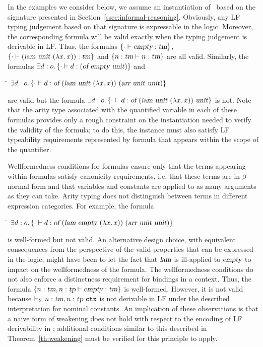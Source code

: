 In the examples we consider below, we assume an instantiation of
\logic\ 
based on the signature presented in
Section~\ref{ssec:informal-reasoning}.
%
Obviously, any LF typing judgement based on that signature is expressable
in the logic.
%
Moreover, the corresponding formula will be valid exactly when the
typing judgement is derivable in LF.
%
Thus, the formulas
$\left\{\cdot \vdash \mbox{\sl empty} : \mbox{\sl tm}\right\}$,
$\left\{\cdot \vdash (\mbox{\sl lam}\  \mbox{\sl unit}\  (\lambda {x}.{\mkern 3mu} x)) : \mbox{\sl tm}\right\}$ and
$\left\{n : \mbox{\sl tm} \vdash n:\mbox{\sl tm}\right\}$ are all valid. 
Similarly, the formulas
$\exists d:o. \left\{\cdot \vdash d : (\mbox{\sl of} \  \mbox{\sl empty}\ 
    \mbox{\sl unit})\right\}$ and
\begin{tabbing}
\qquad\=\kill
\>$\exists d:o. \left\{\cdot \vdash d :\mbox{\sl of} \  (\mbox{\sl lam} \  \mbox{\sl unit}\ 
    (\lambda {x}.{\mkern 3mu} x))\  (\mbox{\sl arr}\  \mbox{\sl unit}\  \mbox{\sl unit})\right\}$
\end{tabbing}
are valid but the formula
$\exists d:o. \left\{\cdot \vdash d:\mbox{\sl of} \ 
    (\mbox{\sl lam} \  \mbox{\sl unit}\  (\lambda {x}.{\mkern 3mu} x))\  \mbox{\sl unit}\right\}$
is not.
%
Note that the arity type associated with the quantified variable in
each of these formulas provides only a rough constraint on the
instantiation needed to verify the validity of the formula; to do
this, the instance must also satisfy LF typeability requirements
represented by formula that appears within the scope of the
quantifier.

Wellformedness conditions for formulas ensure only that the terms
appearing within formulas satisfy canonicity requirements, i.e. that
these terms are in $\beta$-normal form and that variables and
constants are applied to as many arguments as they can take.
%
Arity typing does not distinguish between terms in different
expression categories.
%
For example, the formula
\begin{tabbing}
\qquad\=\kill
\> $\exists d:o. \left\{\cdot \vdash d:\mbox{\sl of} \  (\mbox{\sl lam} \  \mbox{\sl empty} \ 
    (\lambda {x}.{\mkern 3mu} x))\  (\mbox{\sl arr}\  \mbox{\sl unit}\  \mbox{\sl unit})\right\}$
\end{tabbing}
is well-formed but not valid.
%
An alternative design choice, with equivalent consequences from the
perspective of the valid properties that can be expressed in the
logic, might have been to let the fact that $\mbox{\sl lam}$ is ill-applied to
$\mbox{\sl empty}$ to impact on the wellformedness of the formula.
%
The wellformedness conditions do not also enforce a distinctness
requirement for bindings in a context.
%
Thus, the formula $\left\{n : \mbox{\sl tm}, n : \mbox{\sl tp} \vdash \mbox{\sl empty} : \mbox{\sl tm}\right\}$ is
well-formed.
%
However, it is not valid because $\vdash_{\Sigma} n : \mbox{\sl tm}, n : \mbox{\sl tp}\ \mbox{\tt ctx}$ is not
derivable in LF under the described interpretation for nominal
constants.
%
An implication of these observations is that a naive form of weakening 
does not hold with respect to the encoding of LF derivability in
\logic; additional conditions similar to this described in 
Theorem~\ref{th:weakening} must be verified for this principle to
apply.

